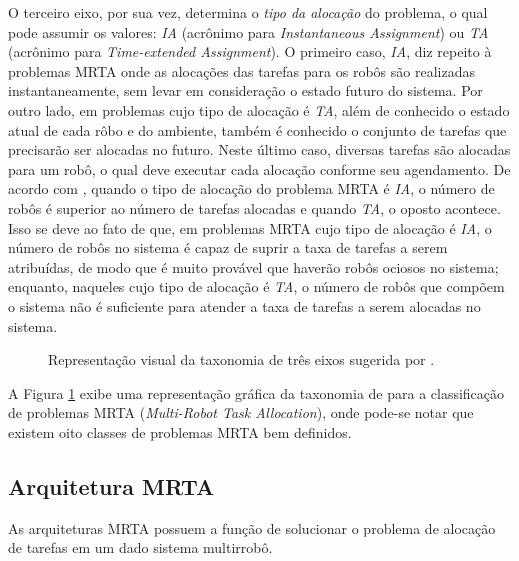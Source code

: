             O terceiro eixo, por sua vez, determina o \textit{tipo da alocação} do problema, o qual pode assumir os valores: \textit{IA} (acrônimo para \textit{Instantaneous Assignment}) ou \textit{TA} (acrônimo para \textit{Time-extended Assignment}). O primeiro caso, \textit{IA}, diz repeito à problemas MRTA onde as alocações das tarefas para os robôs são realizadas instantaneamente, sem levar em consideração o estado futuro do sistema. Por outro lado, em problemas cujo tipo de alocação é \textit{TA}, além de conhecido o estado atual de cada rôbo e do ambiente, também é conhecido o conjunto de tarefas que precisarão ser alocadas no futuro. Neste último caso, diversas tarefas são alocadas para um robô, o qual deve executar cada alocação conforme seu agendamento. De acordo com , quando o tipo de alocação do problema MRTA é \textit{IA}, o número de robôs é superior ao número de tarefas alocadas e quando \textit{TA}, o oposto acontece. Isso se deve ao fato de que, em problemas MRTA cujo tipo de alocação é \textit{IA}, o número de robôs no sistema é capaz de suprir a taxa de tarefas a serem atribuídas, de modo que é muito provável que haverão robôs ociosos no sistema; enquanto, naqueles cujo tipo de alocação é \textit{TA}, o número de robôs que compõem o sistema não é suficiente para atender a taxa de tarefas a serem alocadas no sistema.
            
            \begin{figure}[htb]
                \centering
                
                \caption[Representação visual da taxonomia de três eixos]{Representação visual da taxonomia de três eixos sugerida por .} \label{fig:taxomia_mrta}
            \end{figure}
            
            A Figura \ref{fig:taxomia_mrta} exibe uma representação gráfica da taxonomia de  para a classificação de problemas MRTA (\textit{Multi-Robot Task Allocation}), onde pode-se notar que existem oito classes de problemas MRTA bem definidos.
            
        \subsection{Arquitetura MRTA} \label{subsec:arquiteturas_mrta}
            As arquiteturas MRTA possuem a função de solucionar o problema de alocação de tarefas em um dado sistema multirrobô.
            
